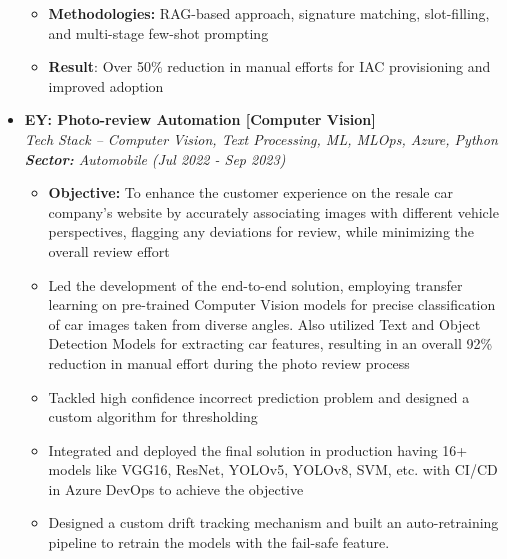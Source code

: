 \documentclass[a4paper,10pt]{article}
\newcommand{\isep}{-2 pt}
\begin{document}
\begin{itemize}
\begin{itemize}
    \item \textbf{Methodologies: }  RAG-based approach, signature matching, slot-filling, and multi-stage few-shot prompting
    \item \textbf{Result}: Over 50\% reduction in manual efforts for IAC provisioning and improved adoption
    \\ [-0.5cm]
    \end{itemize}

\item \textbf{EY: Photo-review Automation [Computer Vision]}  \\
    \emph{Tech Stack -- Computer Vision, Text Processing, ML, MLOps, Azure, Python 
    \qquad \textbf{Sector:} Automobile } \hfill {\emph{(Jul 2022 - Sep 2023)}}
    \\[-0.6cm]
    \begin{itemize}\itemsep \isep
    	\item \textbf{Objective:} To enhance the customer experience on the resale car company's website by accurately associating images with different vehicle perspectives, flagging any deviations for review, while minimizing the overall review effort 
        \item Led the development of the end-to-end solution, employing transfer learning on pre-trained Computer Vision models for precise classification of car images taken from diverse angles. Also utilized Text and Object Detection Models for extracting car features, resulting in an overall 92\% reduction in manual effort during the photo review process
        \item Tackled high confidence incorrect prediction problem and designed a custom algorithm for thresholding
        \item Integrated and deployed the final solution in production having 16+ models like VGG16, ResNet, YOLOv5, YOLOv8, SVM, etc. with CI/CD in Azure DevOps to achieve the objective
        \item Designed a custom drift tracking mechanism and built an auto-retraining pipeline to retrain the models with the fail-safe feature.
        \\ [-0.5cm]
    \end{itemize}


\end{itemize}
\end{document}
